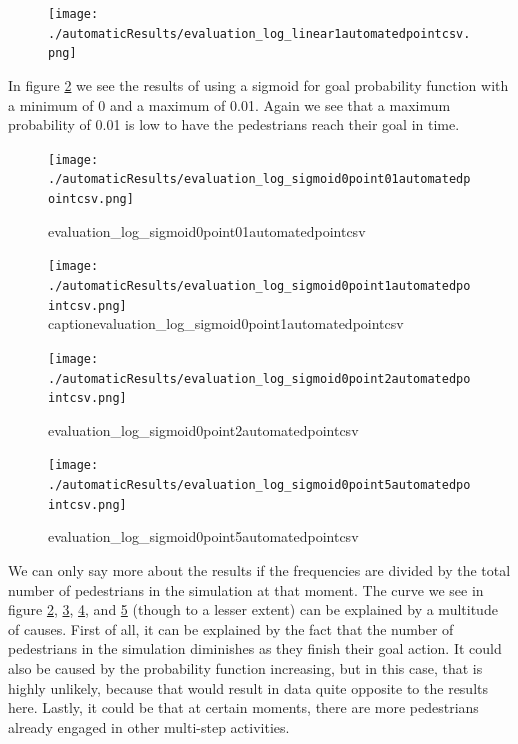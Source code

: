 \documentclass[11pt]{book}
\begin{document}
\begin{figure}
\centering
\texttt{[image: ./automaticResults/evaluation\_log\_linear1automatedpointcsv.png]}
\label{evaluation_log_linear1automatedpointcsv}
\end{figure}

In figure \ref{evaluation_log_sigmoid0point01automatedpointcsv} we see the results of using a sigmoid for goal probability function with a minimum  of 0 and a maximum of 0.01. Again we see that a maximum probability of 0.01 is low to have the pedestrians reach their goal in time.

\begin{figure}
\centering
\texttt{[image: ./automaticResults/evaluation\_log\_sigmoid0point01automatedpointcsv.png]}
\caption{evaluation\_log\_sigmoid0point01automatedpointcsv}
\label{evaluation_log_sigmoid0point01automatedpointcsv}
\end{figure}



\begin{figure}
\centering
\texttt{[image: ./automaticResults/evaluation\_log\_sigmoid0point1automatedpointcsv.png]}
caption{evaluation\_log\_sigmoid0point1automatedpointcsv}
\label{evaluation_log_sigmoid0point1automatedpointcsv}
\end{figure}

\begin{figure}
\centering
\texttt{[image: ./automaticResults/evaluation\_log\_sigmoid0point2automatedpointcsv.png]}
\caption{evaluation\_log\_sigmoid0point2automatedpointcsv}
\label{evaluation_log_sigmoid0point2automatedpointcsv}
\end{figure}

\begin{figure}
\centering
\texttt{[image: ./automaticResults/evaluation\_log\_sigmoid0point5automatedpointcsv.png]}
\caption{evaluation\_log\_sigmoid0point5automatedpointcsv}
\label{evaluation_log_sigmoid0point5automatedpointcsv}
\end{figure}

We can only say more about the results if the frequencies are divided by the total number of pedestrians in the simulation at that moment. The curve we see in figure \ref{evaluation_log_sigmoid0point01automatedpointcsv}, \ref{evaluation_log_sigmoid0point1automatedpointcsv}, \ref{evaluation_log_sigmoid0point2automatedpointcsv}, and \ref{evaluation_log_sigmoid0point5automatedpointcsv} (though to a lesser extent) can be explained by a multitude of causes. First of all, it can be explained by the fact that the number of pedestrians in the simulation diminishes as they finish their goal action. It could also be caused by the probability function increasing, but in this case, that is highly unlikely, because that would result in data quite opposite to the results here. Lastly, it could be that at certain moments, there are more pedestrians already engaged in other multi-step activities.
\end{document}
